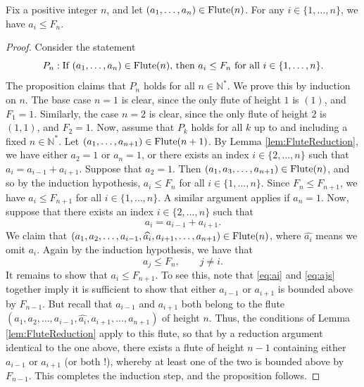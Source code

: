 \begin{proposition}
    \label{prop:FluteBounded}
    \leanok
    Fix a positive integer $n$, and let $(a_1, \ldots, a_n) \in {\rm Flute}(n)$. 
    For any $i \in \{1,\ldots, n\}$, we have $a_i \leq F_n$. 
\end{proposition}
\begin{proof}\leanok
   Consider the statement 
   \[
    P_n: \text{If }(a_1, \ldots, a_n) \in {\rm Flute}(n) \text{, then }a_i \leq F_n \text{ for all }i \in \{1,\ldots, n\}.
   \]
   The proposition claims that $P_n$ holds for all $n \in \mathbb{N}^*$. We prove this by induction on $n$. 
   The base case $n = 1$ is clear, since the only flute of height $1$ is $(1)$, and $F_1 = 1$. 
   Similarly, the case $n = 2$ is clear, since the only flute of height $2$ is $(1,1)$, and $F_2 = 1$.
    Now, assume that $P_k$ holds for all $k$ up to and including a fixed $n \in \mathbb{N}^*$. Let $(a_1, \ldots, a_{n+1}) \in {\rm Flute}(n+1)$.
    By Lemma \ref{lem:FluteReduction}, we have either $a_2 = 1$ or $a_n = 1$, or there exists an index $i \in \{2,\ldots, n\}$ such that
    $a_i = a_{i-1} + a_{i+1}$. Suppose that $a_2 = 1$. Then $(a_1, a_3, \ldots, a_{n+1}) \in {\rm Flute}(n)$, and so by the induction hypothesis, 
    $a_i \leq F_n$ for all $i \in \{1,\ldots, n\}$. Since $F_n \leq F_{n+1}$, we have $a_i \leq F_{n+1}$ for all $i \in \{1,\ldots, n\}$. 
    A similar argument applies if $a_n = 1$. Now, suppose that there exists an index $i \in \{2,\ldots, n\}$ such that 
    \begin{equation}\label{eq:ai}
        a_i = a_{i-1} + a_{i+1}.
    \end{equation} 
    We claim that $(a_1, a_2, \ldots , a_{i-1}, \widehat{a_i}, a_{i+1}, \ldots, a_{n+1}) \in {\rm Flute}(n)$, where $\widehat{a_i}$ means we omit $a_i$.
    Again by the induction hypothesis, we have that 
    \begin{equation}\label{eq:ajs}
        a_j \leq F_n, \qquad j \neq i.
    \end{equation} 
    It remains to show that $a_i \leq F_{n+1}$. 
    To see this, note that \eqref{eq:ai} and \eqref{eq:ajs} together imply it is sufficient to show that either $a_{i-1}$ or $a_{i+1}$ is bounded 
    above by $F_{n-1}$. But recall that $a_{i-1}$ and $a_{i+1}$ both belong to the flute 
    $(a_1, a_2, \ldots , a_{i-1}, \widehat{a_i}, a_{i+1}, \ldots, a_{n+1}) $ of height $n$. Thus, the conditions of Lemma \ref{lem:FluteReduction} apply
    to this flute, so that by a reduction argument identical to the one above, there exists a flute of height $n-1$ containing either $a_{i-1}$ or $a_{i+1}$ (or both !), 
    whereby at least one of the two is bounded above by $F_{n-1}$. This completes the induction step, and the proposition follows.
\end{proof}


